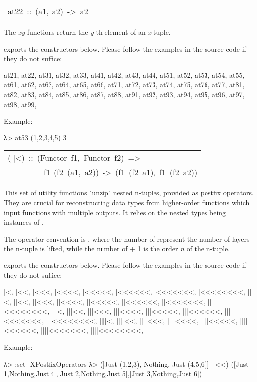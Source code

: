 \begin{haddockdesc}
\item[\begin{tabular}{@{}l}
at22\ ::\ (a1,\ a2)\ ->\ a2
\end{tabular}]\haddockbegindoc
The \emph{xy} functions return the \emph{y}-th element of an \emph{x}-tuple.\par
{} exports the constructors below. Please
 follow the examples in the source code if they do not suffice:\par
\begin{interactive}
at21, at22,
at31, at32, at33,
at41, at42, at43, at44,
at51, at52, at53, at54, at55,
at61, at62, at63, at64, at65, at66, 
at71, at72, at73, at74, at75, at76, at77,
at81, at82, at83, at84, at85, at86, at87, at88,
at91, at92, at93, at94, at95, at96, at97, at98, at99,\end{interactive}
Example:\par
\begin{interactive}
λ> at53 (1,2,3,4,5)
3

\end{interactive}

\item[\begin{tabular}{@{}l}
(||<)\ ::\ (Functor\ f1,\ Functor\ f2)\ =>\\\ \ \ \ \ \ \ \ \ f1\ (f2\ (a1,\ a2))\ ->\ (f1\ (f2\ a1),\ f1\ (f2\ a2))
\end{tabular}]\haddockbegindoc
This set of utility functions "unzip" nested n-tuples, provided
 as postfix operators. They are crucial for reconstructing data
 types from higher-order functions which input functions with
 multiple outputs. It relies on the nested types being instances of
 .\par
The operator convention is \haddocktt{(|+<+)}, where the number of \haddocktt{|}
 represent the number of layers the n-tuple is lifted, while the
 number of \haddocktt{<} + 1 is the order \emph{n} of the n-tuple.\par
{} exports the constructors below. Please
 follow the examples in the source code if they do not suffice:\par
\begin{interactive}
   |<,    |<<,    |<<<,    |<<<<,    |<<<<<,    |<<<<<<,    |<<<<<<<,    |<<<<<<<<,
  ||<,   ||<<,   ||<<<,   ||<<<<,   ||<<<<<,   ||<<<<<<,   ||<<<<<<<,   ||<<<<<<<<,
 |||<,  |||<<,  |||<<<,  |||<<<<,  |||<<<<<,  |||<<<<<<,  |||<<<<<<<,  |||<<<<<<<<,  
||||<, ||||<<, ||||<<<, ||||<<<<, ||||<<<<<, ||||<<<<<<, ||||<<<<<<<, ||||<<<<<<<<, \end{interactive}
Example:\par
\begin{interactive}
λ> :set -XPostfixOperators
λ> ([Just (1,2,3), Nothing, Just (4,5,6)] ||<<)
([Just 1,Nothing,Just 4],[Just 2,Nothing,Just 5],[Just 3,Nothing,Just 6])


\end{interactive}
\end{haddockdesc}
